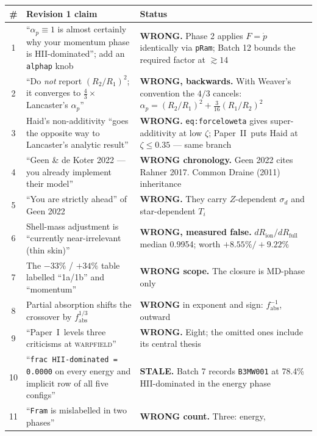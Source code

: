 \documentclass[11pt,a4paper,oneside]{report}
\newcommand{\brkus}{\textunderscore\allowbreak}
\newcommand{\lbl}[1]{\texttt{\footnotesize\let\_\brkus #1}}
\newcommand{\codet}[1]{\texttt{\scriptsize\let\_\brkus #1}}   %
\newcommand{\PI}{Paper~I}
\newcommand{\PII}{Paper~II}
\newcommand{\pdotw}{\dot p}
\newcommand{\ap}{\alpha_p}
\newcommand{\up}[1]{\textcolor{tqaccent}{\textbf{#1}}}
\begin{document}
\begin{table}[htbp]\centering\footnotesize
\begin{tabular}{@{}c>{\raggedright\arraybackslash}p{}
                  >{\raggedright\arraybackslash}p{}@{}}
\toprule
\textbf{\sffamily \#} & \textbf{\sffamily Revision 1 claim} & \textbf{\sffamily Status}\\
\midrule
1 & ``$\ap\equiv1$ is almost certainly why your momentum phase is HII-dominated''; add an
    \codet{alpha\_p} knob & \up{WRONG.} Phase 2 applies $F=\pdotw$ identically via \codet{pRam};
    Batch 12 bounds the required factor at $\gtrsim14$\\
2 & ``Do \emph{not} report $(R_2/R_1)^2$; it converges to $\tfrac43\times$ Lancaster's
    $\ap$'' & \up{WRONG, backwards.} With Weaver's convention the $4/3$ cancels:
    $\ap=(R_2/R_1)^2+\tfrac3{16}(R_1/R_2)^2$\\
3 & Haid's non-additivity ``goes the opposite way to Lancaster's analytic result'' &
    \up{WRONG.} \lbl{eq:force\_low\_eta} gives super-additivity at low $\zeta$; \PII\ puts
    Haid at $\zeta\le0.35$ --- same branch\\
4 & ``Geen \& de Koter 2022 --- you already implement their model'' & \up{WRONG chronology.}
    Geen 2022 cites Rahner 2017. Common Draine (2011) inheritance\\
5 & ``You are strictly ahead'' of Geen 2022 & \up{WRONG.} They carry $Z$-dependent
    $\sigma_d$ and star-dependent $T_i$\\
6 & Shell-mass adjustment is ``currently near-irrelevant (thin skin)'' & \up{WRONG, measured
    false.} $dR_{\mathrm{ion}}/dR_{\mathrm{full}}$ median 0.9954; worth $+8.55\%/+9.22\%$\\
7 & The $-33\%$ / $+34\%$ table labelled ``1a/1b'' and ``momentum'' & \up{WRONG scope.} The
    closure is MD-phase only\\
8 & Partial absorption shifts the crossover by $f_{\mathrm{abs}}^{1/3}$ & \up{WRONG} in
    exponent and sign: $f_{\mathrm{abs}}^{-1}$, outward\\
9 & ``\PI\ levels three criticisms at \textsc{warpfield}'' & \up{WRONG.} Eight; the omitted
    ones include its central thesis\\
10 & ``\codet{frac HII-dominated = 0.0000} on every energy and implicit row of all five
    configs'' & \up{STALE.} Batch 7 records \codet{B3MW001} at 78.4\% HII-dominated in the
    energy phase\\
11 & ``\codet{F\_ram} is mislabelled in two phases'' & \up{WRONG count.} Three: energy,

\end{tabular}
\end{table}
\end{document}
